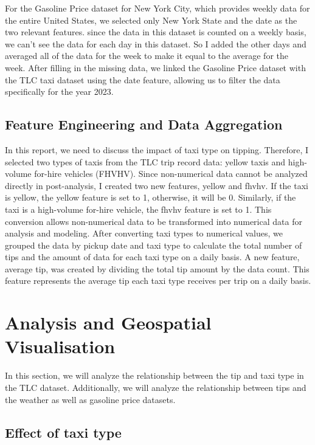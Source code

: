 \documentclass[11pt]{article}
\begin{document}
For the Gasoline Price dataset for New York City, which provides weekly data for the entire United States, we selected only New York State and the date as the two relevant features. since the data in this 
dataset is counted on a weekly basis, we can't see the data for each day in this dataset. So I added the other days and averaged all of the data for the week to make it equal to the average for the week. 
After filling in the missing data, we linked the Gasoline Price dataset with the TLC taxi dataset using the date feature, allowing us to filter the data specifically for the year 2023.

\subsection{Feature Engineering and Data Aggregation}

In this report, we need to discuss the impact of taxi type on tipping. Therefore, I selected two types of taxis from the TLC trip record data: yellow taxis and high-volume for-hire vehicles (FHVHV). 
Since non-numerical data cannot be analyzed directly in post-analysis, I created two new features, yellow and fhvhv. If the taxi is yellow, the yellow feature is set to 1, otherwise, it will be 0. 
Similarly, if the taxi is a high-volume for-hire vehicle, the fhvhv feature is set to 1. This conversion allows non-numerical data to be transformed into numerical data for analysis and 
modeling. After converting taxi types to numerical values, we grouped the data by pickup date and taxi type to calculate the total number of tips and the amount of data for each taxi type 
on a daily basis. A new feature, average tip, was created by dividing the total tip amount by the data count. This feature represents the average tip each taxi type receives per trip on 
a daily basis.


\section{Analysis and Geospatial Visualisation}

In this section, we will analyze the relationship between the tip and taxi type in the TLC dataset. Additionally, we will analyze the relationship between tips and the weather as well as 
gasoline price datasets.
\subsection{Effect of taxi type}
\end{document}
